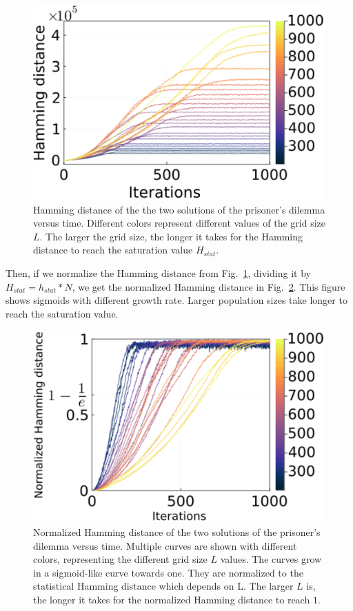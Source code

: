 \begin{figure}
	\centering
	\includegraphics[width=0.8\linewidth]{Images/P3/HammingTimePopulation_PD.eps}
	\caption{Hamming distance of the the two solutions of the prisoner's dilemma versus time. Different colors represent different values of the grid size $L$. The larger the grid size, the longer it takes for the Hamming distance to reach the saturation value $H_{stat}$.}
	\label{fig:HammingTimePopulation_PD}
\end{figure}






Then, if we normalize the Hamming distance from Fig.~\ref{fig:HammingTimePopulation_PD}, dividing it by $H_{stat} = h_{stat}*N$, we get the normalized Hamming distance in Fig.~\ref{fig:NormalHammingTimePopulation_PD}. This figure shows sigmoids with different growth rate. Larger population sizes take longer to reach the saturation value.



\begin{figure}
	\centering
	\includegraphics[width=0.8\linewidth]{Images/P3/NormalHammingTimePopulation_PD.eps}
	\caption{ Normalized Hamming distance of the two solutions of the prisoner's dilemma versus time. Multiple curves are shown with different colors, representing the different grid size $L$ values. The curves grow in a sigmoid-like curve towards one. They are normalized to the statistical Hamming distance which depends on L. The larger $L$ is, the longer it takes for the normalized Hamming distance to reach $1$.}
	\label{fig:NormalHammingTimePopulation_PD}
\end{figure}


